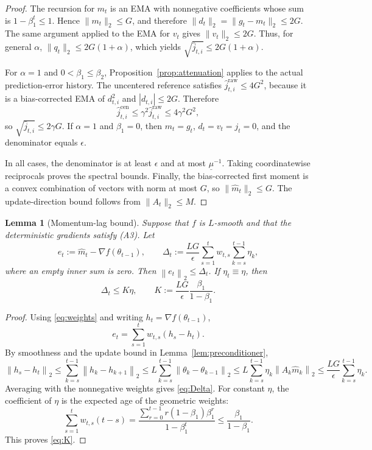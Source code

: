 \documentclass[11pt]{article}
\newtheorem{lemma}[theorem]{Lemma}
\newcommand{\norm}[1]{\left\lVert #1\right\rVert}
\begin{document}
\begin{proof}
The recursion for $m_t$ is an EMA with nonnegative coefficients whose sum is $1-\beta_1^t\leq1$. Hence $\|m_t\|_2\leq G$, and therefore $\|d_t\|_2=\|g_t-m_t\|_2\leq2G$. The same argument applied to the EMA for $v_t$ gives $\|v_t\|_2\leq2G$. Thus, for general $\alpha$, $\|q_t\|_2\leq2G(1+\alpha)$, which yields $\sqrt{\widehat j_{t,i}}\leq2G(1+\alpha)$.

For $\alpha=1$ and $0<\beta_1\leq\beta_2$, Proposition~\ref{prop:attenuation} applies to the actual prediction-error history. The uncentered reference satisfies $\widehat j_{t,i}^{\mathrm{raw}}\leq4G^2$, because it is a bias-corrected EMA of $d_{t,i}^2$ and $|d_{t,i}|\leq2G$. Therefore
\[
 \widehat j_{t,i}^{\mathrm{cen}}
 \leq\gamma^2\widehat j_{t,i}^{\mathrm{raw}}
 \leq4\gamma^2G^2,
\]
so $\sqrt{\widehat j_{t,i}}\leq2\gamma G$. If $\alpha=1$ and $\beta_1=0$, then $m_t=g_t$, $d_t=v_t=j_t=0$, and the denominator equals $\epsilon$.

In all cases, the denominator is at least $\epsilon$ and at most $\underline\mu^{-1}$. Taking coordinatewise reciprocals proves the spectral bounds. Finally, the bias-corrected first moment is a convex combination of vectors with norm at most $G$, so $\|\widehat m_t\|_2\leq G$. The update-direction bound follows from $\|A_t\|_2\leq M$.
\end{proof}

\begin{lemma}[Momentum-lag bound]\label{lem:lag}
Suppose that $f$ is $L$-smooth and that the deterministic gradients satisfy (A3). Let
\begin{equation}
 e_t:=\widehat m_t-\nabla f(\theta_{t-1}),
 \qquad
 \Delta_t:=\frac{LG}{\epsilon}
 \sum_{s=1}^{t}w_{t,s}\sum_{k=s}^{t-1}\eta_k,
 \label{eq:Delta}
\end{equation}
where an empty inner sum is zero. Then $\norm{e_t}_2\le\Delta_t$. If $\eta_t\equiv\eta$, then
\begin{equation}
 \Delta_t\le K\eta,
 \qquad K:=\frac{LG}{\epsilon}\frac{\beta_1}{1-\beta_1}.
 \label{eq:K}
\end{equation}
\end{lemma}

\begin{proof}
Using \eqref{eq:weights} and writing $h_t=\nabla f(\theta_{t-1})$,
\[
 e_t=\sum_{s=1}^tw_{t,s}(h_s-h_t).
\]
By smoothness and the update bound in Lemma~\ref{lem:preconditioner},
\[
 \norm{h_s-h_t}_2
 \le\sum_{k=s}^{t-1}\norm{h_k-h_{k+1}}_2
 \le L\sum_{k=s}^{t-1}\norm{\theta_k-\theta_{k-1}}_2
 \le L\sum_{k=s}^{t-1}\eta_k\norm{A_k\widehat m_k}_2
 \le\frac{LG}{\epsilon}\sum_{k=s}^{t-1}\eta_k.
\]
Averaging with the nonnegative weights gives \eqref{eq:Delta}. For constant $\eta$, the coefficient of $\eta$ is the expected age of the geometric weights:
\[
 \sum_{s=1}^tw_{t,s}(t-s)
 =\frac{\sum_{r=0}^{t-1}r(1-\beta_1)\beta_1^r}{1-\beta_1^t}
 \le\frac{\beta_1}{1-\beta_1}.
\]
This proves \eqref{eq:K}.
\end{proof}
\end{document}
